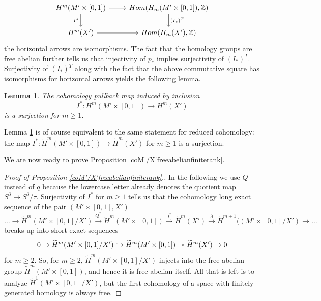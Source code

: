 \documentclass[11pt]{amsart}
\newtheorem{lemma}[theorem]{Lemma}
\theoremstyle{definition}
\theoremstyle{remark}
\def\Z{\mathbb{Z}}
\numberwithin{equation}{section}
\begin{document}
\[
\begin{tikzcd}
H^m(M'\times[0,1]) \arrow{r}{} \arrow[swap]{d}{I^*} & \textrm{Hom}(H_m(M'\times[0,1]),\Z) \arrow{d}{(I_*)^T} \\
H^m(X')  \arrow{r}{} & \textrm{Hom}(H_m(X'), \Z)
\end{tikzcd}
\]
the horizontal arrows are isomorphisms. The fact that the homology groups are free abelian further tells us that injectivity of $p_*$ implies surjectivity of $(I_*)^T$. Surjectivity of $(I_*)^T$ along with the fact that the above commutative square has isomorphisms for horizontal arrows yields the following lemma.

\begin{lemma}\label{M'Xsurj}
    The cohomology pullback map induced by inclusion \[I^*\colon H^m(M'\times[0,1])\to H^m(X')\] is a surjection for $m\ge 1$.
\end{lemma}
Lemma \ref{M'Xsurj} is of course equivalent to the same statement for reduced cohomology: the map $I^*\colon \widetilde{H}^m(M'\times[0,1])\to \widetilde{H}^m(X')$ for $m\ge 1$ is a surjection. 

We are now ready to prove Proposition \ref{coM'/X'freeabelianfiniterank}.

\begin{proof}[Proof of Proposition \ref{coM'/X'freeabelianfiniterank}.]
In the following we use $Q$ instead of $q$ because the lowercase letter already denotes the quotient map $S^3\to S^3/\tau$. Surjectivity of $I^*$ for $m\ge 1$ tells us that the cohomology long exact sequence of the pair $(M'\times[0,1],X')$
\[\hdots \to\widetilde{H}^m(M'\times[0,1]/X')\xrightarrow{Q^*}\widetilde{H}^m(M'\times[0,1])\xrightarrow{I^*}\widetilde{H}^m(X')\xrightarrow{\partial}\widetilde{H}^{m+1}((M'\times[0,1]/X')\to\hdots\]
breaks up into short exact sequences
\[
0\to\widetilde{H}^m(M'\times[0,1]/X')\xhookrightarrow{}\widetilde{H}^m(M'\times[0,1])\twoheadrightarrow\widetilde{H}^m(X')\to 0
\]
for $m\ge 2$. So, for $m\ge 2$, $\widetilde{H}^m(M'\times[0,1]/X')$ injects into the free abelian group $\widetilde{H}^m(M'\times[0,1])$, and hence it is free abelian itself. All that is left is to analyze $\widetilde{H}^1(M'\times[0,1]/X')$, but the first cohomology of a space with finitely generated homology is always free.
\end{proof}
\end{document}
